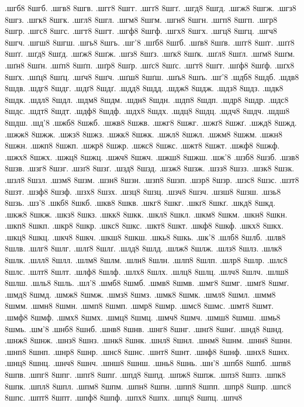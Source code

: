 {%
.шгб8
8шгб.
.шгв8
8шгв.
.шгг8
8шгг.
.шгґ8
8шгґ.
.шгд8
8шгд.
.шгж8
8шгж.
.шгз8
8шгз.
.шгк8
8шгк.
.шгл8
8шгл.
.шгм8
8шгм.
.шгн8
8шгн.
.шгп8
8шгп.
.шгр8
8шгр.
.шгс8
8шгс.
.шгт8
8шгт.
.шгф8
8шгф.
.шгх8
8шгх.
.шгц8
8шгц.
.шгч8
8шгч.
.шгш8
8шгш.
.шгь8
8шгь.
.шг'8
.шґб8
8шґб.
.шґв8
8шґв.
.шґг8
8шґг.
.шґґ8
8шґґ.
.шґд8
8шґд.
.шґж8
8шґж.
.шґз8
8шґз.
.шґк8
8шґк.
.шґл8
8шґл.
.шґм8
8шґм.
.шґн8
8шґн.
.шґп8
8шґп.
.шґр8
8шґр.
.шґс8
8шґс.
.шґт8
8шґт.
.шґф8
8шґф.
.шґх8
8шґх.
.шґц8
8шґц.
.шґч8
8шґч.
.шґш8
8шґш.
.шґь8
8шґь.
.шґ'8
.шдб8
8шдб.
.шдв8
8шдв.
.шдг8
8шдг.
.шдґ8
8шдґ.
.шдд8
8шдд.
.шдж8
8шдж.
.шдз8
8шдз.
.шдк8
8шдк.
.шдл8
8шдл.
.шдм8
8шдм.
.шдн8
8шдн.
.шдп8
8шдп.
.шдр8
8шдр.
.шдс8
8шдс.
.шдт8
8шдт.
.шдф8
8шдф.
.шдх8
8шдх.
.шдц8
8шдц.
.шдч8
8шдч.
.шдш8
8шдш.
.шд'8
.шжб8
8шжб.
.шжв8
8шжв.
.шжг8
8шжг.
.шжґ8
8шжґ.
.шжд8
8шжд.
.шжж8
8шжж.
.шжз8
8шжз.
.шжк8
8шжк.
.шжл8
8шжл.
.шжм8
8шжм.
.шжн8
8шжн.
.шжп8
8шжп.
.шжр8
8шжр.
.шжс8
8шжс.
.шжт8
8шжт.
.шжф8
8шжф.
.шжх8
8шжх.
.шжц8
8шжц.
.шжч8
8шжч.
.шжш8
8шжш.
.шж'8
.шзб8
8шзб.
.шзв8
8шзв.
.шзг8
8шзг.
.шзґ8
8шзґ.
.шзд8
8шзд.
.шзж8
8шзж.
.шзз8
8шзз.
.шзк8
8шзк.
.шзл8
8шзл.
.шзм8
8шзм.
.шзн8
8шзн.
.шзп8
8шзп.
.шзр8
8шзр.
.шзс8
8шзс.
.шзт8
8шзт.
.шзф8
8шзф.
.шзх8
8шзх.
.шзц8
8шзц.
.шзч8
8шзч.
.шзш8
8шзш.
.шзь8
8шзь.
.шз'8
.шкб8
8шкб.
.шкв8
8шкв.
.шкг8
8шкг.
.шкґ8
8шкґ.
.шкд8
8шкд.
.шкж8
8шкж.
.шкз8
8шкз.
.шкк8
8шкк.
.шкл8
8шкл.
.шкм8
8шкм.
.шкн8
8шкн.
.шкп8
8шкп.
.шкр8
8шкр.
.шкс8
8шкс.
.шкт8
8шкт.
.шкф8
8шкф.
.шкх8
8шкх.
.шкц8
8шкц.
.шкч8
8шкч.
.шкш8
8шкш.
.шкь8
8шкь.
.шк'8
.шлб8
8шлб.
.шлв8
8шлв.
.шлг8
8шлг.
.шлґ8
8шлґ.
.шлд8
8шлд.
.шлж8
8шлж.
.шлз8
8шлз.
.шлк8
8шлк.
.шлл8
8шлл.
.шлм8
8шлм.
.шлн8
8шлн.
.шлп8
8шлп.
.шлр8
8шлр.
.шлс8
8шлс.
.шлт8
8шлт.
.шлф8
8шлф.
.шлх8
8шлх.
.шлц8
8шлц.
.шлч8
8шлч.
.шлш8
8шлш.
.шль8
8шль.
.шл'8
.шмб8
8шмб.
.шмв8
8шмв.
.шмг8
8шмг.
.шмґ8
8шмґ.
.шмд8
8шмд.
.шмж8
8шмж.
.шмз8
8шмз.
.шмк8
8шмк.
.шмл8
8шмл.
.шмм8
8шмм.
.шмн8
8шмн.
.шмп8
8шмп.
.шмр8
8шмр.
.шмс8
8шмс.
.шмт8
8шмт.
.шмф8
8шмф.
.шмх8
8шмх.
.шмц8
8шмц.
.шмч8
8шмч.
.шмш8
8шмш.
.шмь8
8шмь.
.шм'8
.шнб8
8шнб.
.шнв8
8шнв.
.шнг8
8шнг.
.шнґ8
8шнґ.
.шнд8
8шнд.
.шнж8
8шнж.
.шнз8
8шнз.
.шнк8
8шнк.
.шнл8
8шнл.
.шнм8
8шнм.
.шнн8
8шнн.
.шнп8
8шнп.
.шнр8
8шнр.
.шнс8
8шнс.
.шнт8
8шнт.
.шнф8
8шнф.
.шнх8
8шнх.
.шнц8
8шнц.
.шнч8
8шнч.
.шнш8
8шнш.
.шнь8
8шнь.
.шн'8
.шпб8
8шпб.
.шпв8
8шпв.
.шпг8
8шпг.
.шпґ8
8шпґ.
.шпд8
8шпд.
.шпж8
8шпж.
.шпз8
8шпз.
.шпк8
8шпк.
.шпл8
8шпл.
.шпм8
8шпм.
.шпн8
8шпн.
.шпп8
8шпп.
.шпр8
8шпр.
.шпс8
8шпс.
.шпт8
8шпт.
.шпф8
8шпф.
.шпх8
8шпх.
.шпц8
8шпц.
.шпч8
}
